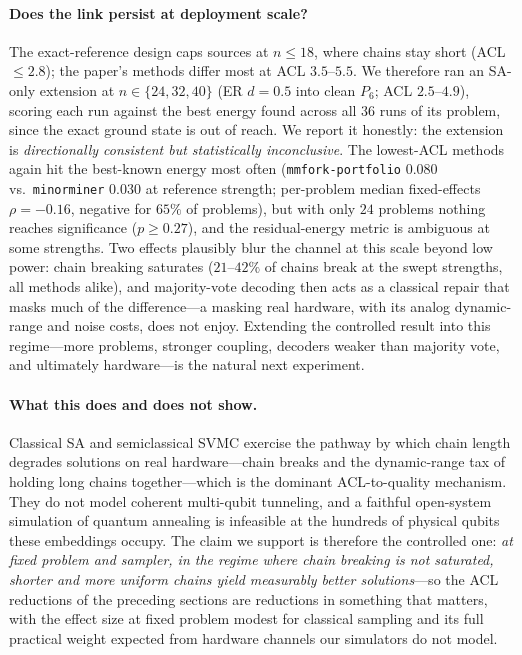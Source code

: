 \documentclass[acmsmall,anonymous,nonacm]{acmart}
\begin{document}
\paragraph{Does the link persist at deployment scale?} The exact-reference design
caps sources at $n\le18$, where chains stay short (ACL $\le2.8$); the paper's
methods differ most at ACL $3.5$--$5.5$. We therefore ran an SA-only extension at
$n\in\{24,32,40\}$ (ER $d{=}0.5$ into clean $P_6$; ACL $2.5$--$4.9$), scoring each
run against the best energy found across all $36$ runs of its problem, since the
exact ground state is out of reach. We report it honestly: the extension is
\emph{directionally consistent but statistically inconclusive}. The lowest-ACL
methods again hit the best-known energy most often (\texttt{mmfork-portfolio}
$0.080$ vs.\ \texttt{minorminer} $0.030$ at reference strength; per-problem median
fixed-effects $\rho=-0.16$, negative for $65\%$ of problems), but with only $24$
problems nothing reaches significance ($p\ge0.27$), and the residual-energy metric
is ambiguous at some strengths. Two effects plausibly blur the channel at this
scale beyond low power: chain breaking saturates ($21$--$42\%$ of chains break at
the swept strengths, all methods alike), and majority-vote decoding then acts as a
classical repair that masks much of the difference---a masking real hardware, with
its analog dynamic-range and noise costs, does not enjoy. Extending the controlled
result into this regime---more problems, stronger coupling, decoders weaker than
majority vote, and ultimately hardware---is the natural next experiment.

\paragraph{What this does and does not show.} Classical SA and semiclassical SVMC
exercise the pathway by which chain length degrades solutions on real hardware---chain
breaks and the dynamic-range tax of holding long chains together---which is the
dominant ACL-to-quality mechanism. They do not model coherent multi-qubit tunneling,
and a faithful open-system simulation of quantum annealing is infeasible at the
hundreds of physical qubits these embeddings occupy. The claim we support is
therefore the controlled one: \emph{at fixed problem and sampler, in the regime
where chain breaking is not saturated, shorter and more
uniform chains yield measurably better solutions}---so the ACL reductions of the
preceding sections are reductions in something that matters, with the effect size
at fixed problem modest for classical sampling and its full practical weight
expected from hardware channels our simulators do not model.
\end{document}
